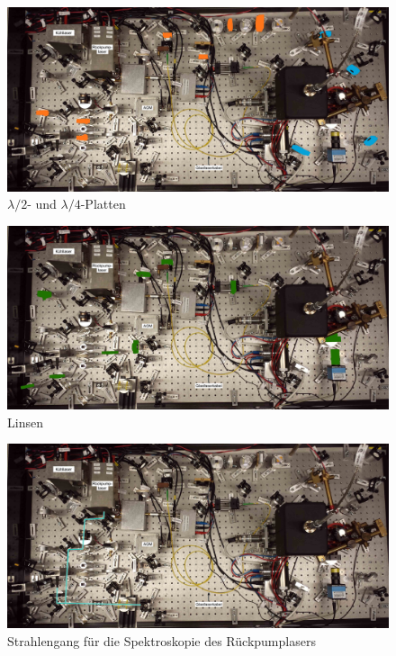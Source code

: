 \documentclass[
class=book,
accentcolor=1b,
custommargins=geometry,
fontsize=11pt,
thesis={type=Versuchsanleitung},
ruledheaders=all,
headline=false,
instbox=false,
marginpar=false,
title=small,
ignore-missing-data=true,
twoside=false,
logofile=apqdesign/tuda_logo.pdf,
pdfa=false %
]{apqpub}
\begin{document}
					\begin{figure}[htb!]
						\centering
						\includegraphics[width=\textwidth]{graphics/LHLV.jpg}
						\caption{\textcolor[cmyk]{0,0.68,0.98,0}{$\lambda/2$}- und \textcolor[cmyk]{0.75,0.19,0.03,0}{$\lambda/4$}-Platten}
						\label{fig:LH}
					\end{figure}
					\begin{figure}[htb!]
						\centering
						\includegraphics[width=\textwidth]{graphics/LN.jpg}
						\caption{\textcolor[cmyk]{0.84,0.30,1,0.2}{Linsen}}
						\label{fig:LI}
					\end{figure}
					\begin{figure}[htb!]
						\centering
						\includegraphics[width=\textwidth]{graphics/SPM.jpg}
						\caption{Strahlengang für die \textcolor[cmyk]{0.71,0,0.4,0}{Spektroskopie des Rückpumplasers}}
						\label{fig:SPM}
					\end{figure}
\end{document}
